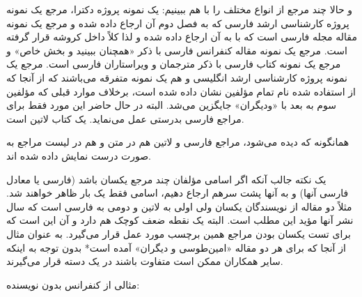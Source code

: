 \documentclass{article} %
\begin{document}
و حالا چند مرجع از انواع مختلف  را با هم ببینیم:  \citet{Omidali82phdThesis} یک نمونه پروژه دکترا، مرجع \citet[فصل ۲]{Pourmousa88mscThesis} یک نمونه پروژه کارشناسی ارشد فارسی که به فصل دوم آن ارجاع داده شده و  مرجع \citep{Abadi87} یک نمونه مقاله مجله فارسی است که با  به آن ارجاع داده شده و لذا کلاً داخل کروشه قرار گرفته است.
 مرجع \citet[همچنین ببینید][بخش ۲]{Amintoosi87afzayesh}  یک نمونه  مقاله کنفرانس فارسی با ذکر «همچنان ببینید و بخش خاص» و مرجع \cite{Pedram80osool} یک نمونه کتاب فارسی با ذکر مترجمان و ویراستاران فارسی است. مرجع \cite{Khalighi07MscThesis}
 یک نمونه پروژه کارشناسی ارشد انگلیسی و \citealp*{Khalighi87xepersian} هم یک نمونه متفرقه  می‌باشند 
که از آنجا که از   استفاده شده نام تمام مؤلفین نشان داده شده است، برخلاف موارد قبلی که مؤلفین سوم به بعد با «ودیگران» جایگزین می‌شد. البته در حال حاضر این مورد فقط برای مراجع فارسی بدرستی عمل می‌نماید. \citet{Gonzalez02book} یک کتاب لاتین است.

همانگونه که دیده می‌شود، مراجع فارسی و لاتین هم در متن و هم در لیست مراجع به صورت درست نمایش داده شده اند. 

یک نکته جالب آنکه اگر اسامی مؤلفان چند مرجع یکسان باشد (فارسی یا معادل فارسی آنها) و  به آنها  پشت سرهم ارجاع دهیم، اسامی فقط یک بار ظاهر خواهند شد. مثلاً \citet{Amintoosi09precise,Amintoosi87afzayesh} دو مقاله از نویسندگان یکسان ولی اولی به لاتین و دومی به فارسی است که سال نشر آنها مؤید این مطلب است. 
 البته یک نقطه ضعف کوچک هم دارد و آن این است که برای تست یکسان بودن مراجع همین برچسب مورد عمل قرار می‌گیرد. به عنوان مثال از آنجا که برای هر دو مقاله «امین‌طوسی و دیگران» آمده است* بدون توجه به اینکه سایر همکاران ممکن است متفاوت باشند در یک دسته قرار می‌گیرند.

مثالی از کنفرانس بدون نویسنده:  \citep{conference06}
\end{document}
